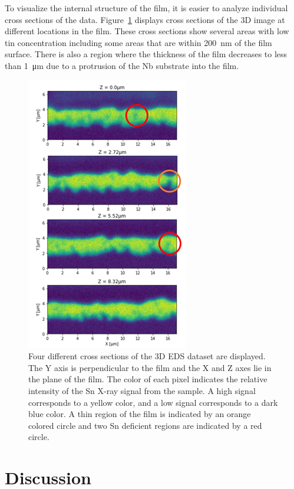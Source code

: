 To visualize the internal structure of the film, it is easier to analyze individual cross sections of the data. Figure~\ref{fig:5} displays cross sections of the 3D image at different locations in the film. These cross sections show several areas with low tin concentration including some areas that are within \qty{200}{\nano\meter} of the film surface. There is also a region where the thickness of the film decreases to less than \qty{1}{\micro\meter} due to a protrusion of the Nb substrate into the film.

\begin{figure}[htb]%
    \centering%
    \includegraphics[width=0.5\columnwidth]{../figs/Figure-5.png}%
    \caption{Four different cross sections of the 3D EDS dataset are displayed. The Y axis is perpendicular to the film and the X and Z axes lie in the plane of the film. The color of each pixel indicates the relative intensity of the Sn X-ray signal from the sample. A high signal corresponds to a yellow color, and a low signal corresponds to a dark blue color. A thin region of the film is indicated by an orange colored circle and two Sn deficient regions are indicated by a red circle.}%
    \label{fig:5}%
\end{figure}

 
\section{Discussion}

